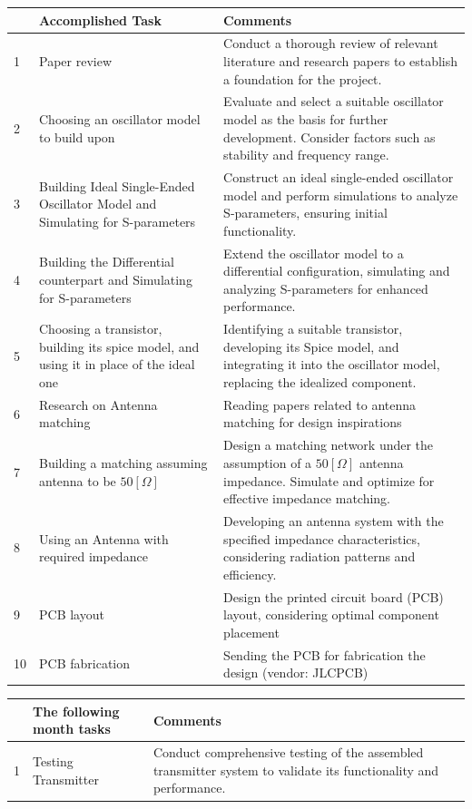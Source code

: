 \documentclass[]{extarticle}
\begin{document}
\begin{tabular}{|p{0.4cm}|p{4cm}|p{11cm}|}
    \hline
    & \textbf{Accomplished Task} & \textbf{Comments}\\
    \hline
    1 & Paper review & Conduct a thorough review of relevant literature and research papers to establish a foundation for the project.  \\
    \hline
    2 & Choosing an oscillator model to build upon & Evaluate and select a suitable oscillator model as the basis for further development. Consider factors such as stability and frequency range.  \\
    \hline
    3 & Building Ideal Single-Ended Oscillator Model and Simulating for S-parameters & Construct an ideal single-ended oscillator model and perform simulations to analyze S-parameters, ensuring initial functionality.  \\
    \hline
    4 & Building the Differential counterpart and Simulating for S-parameters & Extend the oscillator model to a differential configuration, simulating and analyzing S-parameters for enhanced performance. \\
    \hline
    5 & Choosing a transistor, building its spice model, and using it in place of the ideal one & Identifying a suitable transistor, developing its Spice model, and integrating it into the oscillator model, replacing the idealized component. \\
    \hline
    6 & Research on Antenna matching  & Reading papers related to antenna matching for design inspirations\\
    \hline
    7 & Building a matching assuming antenna to be \(50[\Omega]\) & Design a matching network under the assumption of a \(50[\Omega]\) antenna impedance. Simulate and optimize for effective impedance matching.  \\
    \hline
    8 & Using an Antenna with required impedance & Developing an antenna system with the specified impedance characteristics, considering radiation patterns and efficiency. \\
    \hline
    9 & PCB layout & Design the printed circuit board (PCB) layout, considering optimal component placement\\
    \hline
    10 & PCB fabrication& Sending the PCB for fabrication the design (vendor: JLCPCB)\\
    \hline
\end{tabular}

\vspace{2cm}

\begin{tabular}{|p{0.4cm}|p{4cm}|p{11cm}|}
     \hline
    & \textbf{The following month tasks} & \textbf{Comments}\\
    \hline
    1 & Testing Transmitter & Conduct comprehensive testing of the assembled transmitter system to validate its functionality and performance.\\
    \hline
\end{tabular}
\end{document}
